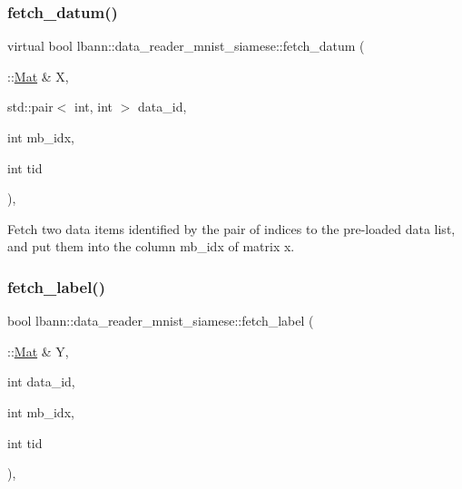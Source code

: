 \subsubsection{\texorpdfstring{fetch\+\_\+datum()}{fetch\_datum()}\hspace{0.1cm}{\footnotesize\ttfamily [2/2]}}
{\footnotesize\ttfamily virtual bool lbann\+::data\+\_\+reader\+\_\+mnist\+\_\+siamese\+::fetch\+\_\+datum (\begin{DoxyParamCaption}\item[{\+::\hyperlink{base_8hpp_a68f11fdc31b62516cb310831bbe54d73}{Mat} \&}]{X,  }\item[{std\+::pair$<$ int, int $>$}]{data\+\_\+id,  }\item[{int}]{mb\+\_\+idx,  }\item[{int}]{tid }\end{DoxyParamCaption})\hspace{0.3cm}{\ttfamily [protected]}, {\ttfamily [virtual]}}

Fetch two data items identified by the pair of indices to the pre-\/loaded data list, and put them into the column mb\+\_\+idx of matrix x. \mbox{\label{classlbann_1_1data__reader__mnist__siamese_a0f4171af4c56100c1c78cb53e938222c}} 
\subsubsection{\texorpdfstring{fetch\+\_\+label()}{fetch\_label()}\hspace{0.1cm}{\footnotesize\ttfamily [1/2]}}
{\footnotesize\ttfamily bool lbann\+::data\+\_\+reader\+\_\+mnist\+\_\+siamese\+::fetch\+\_\+label (\begin{DoxyParamCaption}\item[{\+::\hyperlink{base_8hpp_a68f11fdc31b62516cb310831bbe54d73}{Mat} \&}]{Y,  }\item[{int}]{data\+\_\+id,  }\item[{int}]{mb\+\_\+idx,  }\item[{int}]{tid }\end{DoxyParamCaption})\hspace{0.3cm}{\ttfamily [override]}, {\ttfamily [protected]}}



